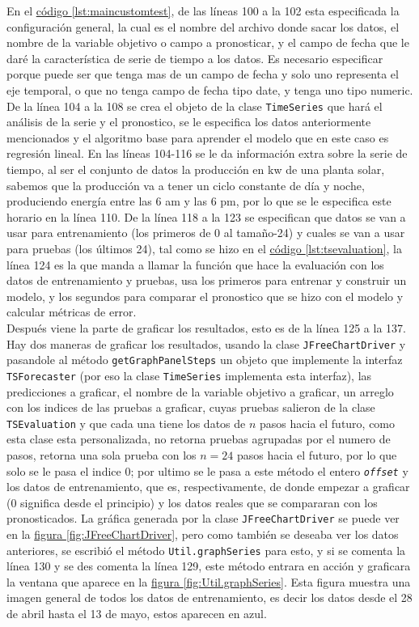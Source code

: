 En el \hyperref[lst:maincustomtest]{código \ref{lst:maincustomtest}}, de las líneas 100 a la 102 esta especificada la configuración general, la cual es el nombre del archivo donde sacar los datos, el nombre de la variable objetivo o campo a pronosticar, y el campo de fecha que le daré la característica de serie de tiempo a los datos. Es necesario especificar porque puede ser que tenga mas de un campo de fecha y solo uno representa el eje temporal, o que no tenga campo de fecha tipo date, y tenga uno tipo numeric.\\
De la línea 104 a la 108 se crea el objeto de la clase \texttt{TimeSeries} que hará el análisis de la serie y el pronostico, se le especifica los datos anteriormente mencionados y el algoritmo base para aprender el modelo que en este caso es regresión lineal. En las líneas 104-116 se le da información extra sobre la serie de tiempo, al ser el conjunto de datos la producción en kw de una planta solar, sabemos que la producción va a tener un ciclo constante de día y noche, produciendo energía entre las 6 am y las 6 pm, por lo que se le especifica este horario en la línea 110.	De la línea 118 a la 123 se especifican que datos se van a usar para entrenamiento (los primeros de 0 al tamaño-24) y cuales se van a usar para pruebas (los últimos 24), tal como se hizo en el \hyperref[lst:tsevaluation]{código \ref{lst:tsevaluation}}, la línea 124 es la que manda a llamar la función que hace la evaluación con los datos de entrenamiento y pruebas, usa los primeros para entrenar y construir un modelo, y los segundos para comparar el pronostico que se hizo con el modelo y calcular métricas de error.\\
Después viene la parte de graficar los resultados, esto es de la línea 125 a la 137. Hay dos maneras de graficar los resultados, usando la clase \texttt{JFreeChartDriver} y pasandole al método \texttt{getGraphPanelSteps} un  objeto que implemente la interfaz \texttt{TSForecaster} (por eso la clase \texttt{TimeSeries} implementa esta interfaz), las predicciones a graficar, el nombre de la variable objetivo a graficar, un arreglo con los indices de las pruebas a graficar, cuyas pruebas salieron de la clase \texttt{TSEvaluation} y que cada una tiene los datos de $n$ pasos hacia el futuro, como esta clase esta personalizada, no retorna pruebas agrupadas por el numero de pasos, retorna una sola prueba con los $n=24$ pasos hacia el futuro, por lo que solo se le pasa el indice 0; por ultimo se le pasa a este método el entero \textit{\texttt{offset}} y los datos de entrenamiento, que es, respectivamente, de donde empezar a graficar (0 significa desde el principio) y los datos reales que se compararan con los pronosticados. La gráfica generada por la clase \texttt{JFreeChartDriver} se puede ver en la 
\hyperref[fig:JFreeChartDriver]{figura \ref{fig:JFreeChartDriver}}, 
pero como también se deseaba ver los datos anteriores, se escribió el método \texttt{Util.graphSeries} para esto, y si se comenta la línea 130 y se des comenta la línea 129, este método entrara en acción y graficara la ventana que aparece en la \hyperref[fig:Util.graphSeries]{figura \ref{fig:Util.graphSeries}}. Esta figura muestra una imagen general de todos los datos de entrenamiento, es decir los datos desde el 28 de abril hasta el 13 de mayo, estos aparecen en azul.

